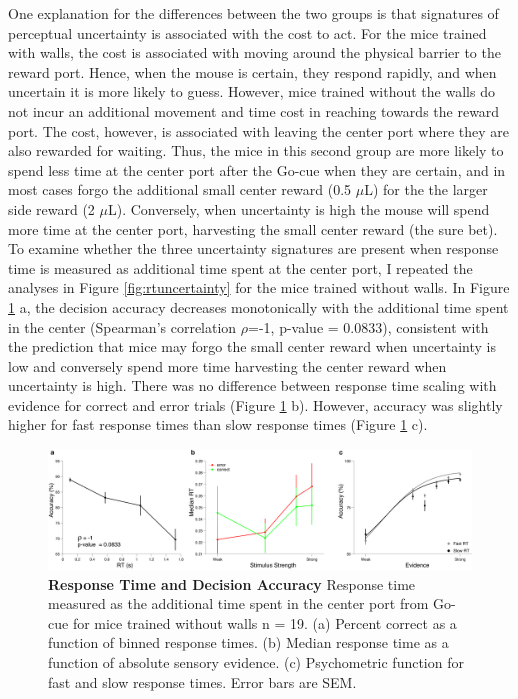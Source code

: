 One explanation for the differences between the two groups is that signatures of perceptual uncertainty is associated with the cost to act. For the mice trained with walls, the cost is associated with moving around the physical barrier to the reward port. Hence, when the mouse is certain, they respond rapidly, and when uncertain it is more likely to guess. However, mice trained without the walls do not incur an additional movement and time cost in reaching towards the reward port. The cost, however, is associated with leaving the center port where they are also rewarded for waiting. Thus, the mice in this second group are more likely to spend less  time at the center port after the Go-cue when they are certain, and in most cases forgo the additional small center reward (0.5 $\mu$L) for the the larger side reward (2 $\mu$L). Conversely, when uncertainty is high the mouse will spend more time at the center port, harvesting the small center reward (the sure bet). To examine whether the three uncertainty signatures are present when response time is measured as additional time spent at the center port, I repeated the analyses in Figure \ref{fig:rtuncertainty} for the mice trained without walls. In Figure \ref{fig:rtuncertaintyNoWalls} a, the decision accuracy decreases monotonically with the additional time spent in the center (Spearman's correlation $\rho$=-1, p-value = 0.0833), consistent with the prediction that mice may forgo the small center reward when uncertainty is low and conversely spend more time harvesting the center reward when uncertainty is high. There was no difference between response time scaling with evidence for correct and error trials (Figure \ref{fig:rtuncertaintyNoWalls} b). However, accuracy was slightly higher for fast response times than slow response times (Figure \ref{fig:rtuncertaintyNoWalls} c).\par 
\begin{figure}
  \centering
  	\includegraphics[width=\textwidth]{Figures/chapter2/RTUncertaintySignaturesNoWallsExtraCenter.png}
  \caption[Response Time and Decision Accuracy-No Walls]{\textbf{Response Time and Decision Accuracy} Response time measured as the additional time spent in the center port from Go-cue for mice trained without walls n = 19. (a) Percent correct as a function of binned response times. (b) Median response time as a function of absolute sensory evidence. (c) Psychometric function for fast and slow response times. Error bars are SEM.}
   \label{fig:rtuncertaintyNoWalls}
\end{figure}
